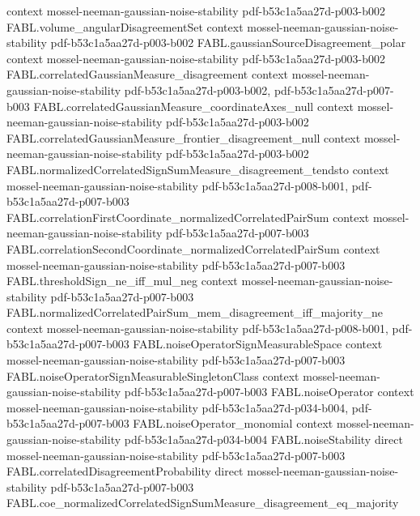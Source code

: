 \begin{theorem}
  {context}
  {mossel-neeman-gaussian-noise-stability}
  {pdf-b53c1a5aa27d-p003-b002}
\proofstep
  {FABL.volume_angularDisagreementSet}
  {context}
  {mossel-neeman-gaussian-noise-stability}
  {pdf-b53c1a5aa27d-p003-b002}
\proofstep
  {FABL.gaussianSourceDisagreement_polar}
  {context}
  {mossel-neeman-gaussian-noise-stability}
  {pdf-b53c1a5aa27d-p003-b002}
\proofstep
  {FABL.correlatedGaussianMeasure_disagreement}
  {context}
  {mossel-neeman-gaussian-noise-stability}
  {pdf-b53c1a5aa27d-p003-b002,
    pdf-b53c1a5aa27d-p007-b003}
\proofstep
  {FABL.correlatedGaussianMeasure_coordinateAxes_null}
  {context}
  {mossel-neeman-gaussian-noise-stability}
  {pdf-b53c1a5aa27d-p003-b002}
\proofstep
  {FABL.correlatedGaussianMeasure_frontier_disagreement_null}
  {context}
  {mossel-neeman-gaussian-noise-stability}
  {pdf-b53c1a5aa27d-p003-b002}
\proofstep
  {FABL.normalizedCorrelatedSignSumMeasure_disagreement_tendsto}
  {context}
  {mossel-neeman-gaussian-noise-stability}
  {pdf-b53c1a5aa27d-p008-b001,
    pdf-b53c1a5aa27d-p007-b003}
\proofstep
  {FABL.correlationFirstCoordinate_normalizedCorrelatedPairSum}
  {context}
  {mossel-neeman-gaussian-noise-stability}
  {pdf-b53c1a5aa27d-p007-b003}
\proofstep
  {FABL.correlationSecondCoordinate_normalizedCorrelatedPairSum}
  {context}
  {mossel-neeman-gaussian-noise-stability}
  {pdf-b53c1a5aa27d-p007-b003}
\proofstep
  {FABL.thresholdSign_ne_iff_mul_neg}
  {context}
  {mossel-neeman-gaussian-noise-stability}
  {pdf-b53c1a5aa27d-p007-b003}
\proofstep
  {FABL.normalizedCorrelatedPairSum_mem_disagreement_iff_majority_ne}
  {context}
  {mossel-neeman-gaussian-noise-stability}
  {pdf-b53c1a5aa27d-p008-b001,
    pdf-b53c1a5aa27d-p007-b003}
\proofstep
  {FABL.noiseOperatorSignMeasurableSpace}
  {context}
  {mossel-neeman-gaussian-noise-stability}
  {pdf-b53c1a5aa27d-p007-b003}
\proofstep
  {FABL.noiseOperatorSignMeasurableSingletonClass}
  {context}
  {mossel-neeman-gaussian-noise-stability}
  {pdf-b53c1a5aa27d-p007-b003}
\proofstep
  {FABL.noiseOperator}
  {context}
  {mossel-neeman-gaussian-noise-stability}
  {pdf-b53c1a5aa27d-p034-b004,
    pdf-b53c1a5aa27d-p007-b003}
\proofstep
  {FABL.noiseOperator_monomial}
  {context}
  {mossel-neeman-gaussian-noise-stability}
  {pdf-b53c1a5aa27d-p034-b004}
\proofstep
  {FABL.noiseStability}
  {direct}
  {mossel-neeman-gaussian-noise-stability}
  {pdf-b53c1a5aa27d-p007-b003}
\proofstep
  {FABL.correlatedDisagreementProbability}
  {direct}
  {mossel-neeman-gaussian-noise-stability}
  {pdf-b53c1a5aa27d-p007-b003}
\proofstep
  {FABL.coe_normalizedCorrelatedSignSumMeasure_disagreement_eq_majority}

\end{theorem}
